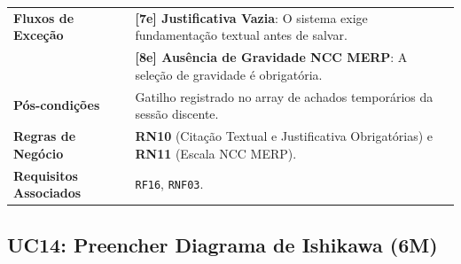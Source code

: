 \begin{table}[!ht]
\begin{tabularx}{\textwidth}{p{3.5cm} X}
\textbf{Fluxos de Exceção} & 
\textbf{[7e] Justificativa Vazia}: O sistema exige fundamentação textual antes de salvar.\\
& \textbf{[8e] Ausência de Gravidade NCC MERP}: A seleção de gravidade é obrigatória. \\
\textbf{Pós-condições} & Gatilho registrado no array de achados temporários da sessão discente. \\
\textbf{Regras de Negócio} & \textbf{RN10} (Citação Textual e Justificativa Obrigatórias) e \textbf{RN11} (Escala NCC MERP). \\
\textbf{Requisitos Associados} & \texttt{RF16}, \texttt{RNF03}. \\
\bottomrule
\end{tabularx}
\end{table}

\subsection{UC14: Preencher Diagrama de Ishikawa (6M)}
\label{uc14_especificacao}


